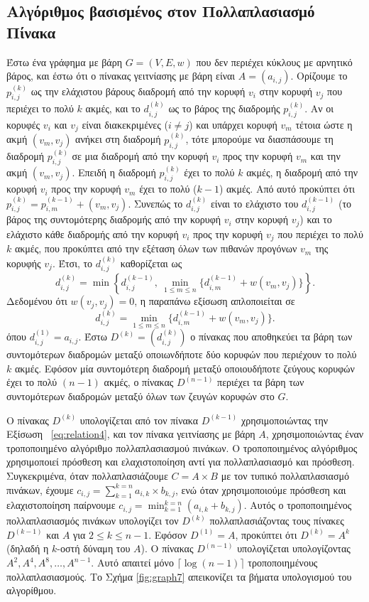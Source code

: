 \documentclass[12pt,a4paper]{article} %
\begin{document}
{\subsection{Αλγόριθμος βασισμένος στον Πολλαπλασιασμό Πίνακα}

Έστω ένα γράφημα με βάρη $G = (V,E,w)$ που δεν περιέχει κύκλους με αρνητικό βάρος, και έστω ότι ο πίνακας γειτνίασης με βάρη είναι $A = (a_{i,j})$. Ορίζουμε το $p_{i,j}^{(k)}$ ως την ελάχιστου βάρους διαδρομή από την κορυφή $v_i$ στην κορυφή $v_j$ που περιέχει το πολύ $k$ ακμές, και το $d_{i,j}^{(k)}$ ως το βάρος της διαδρομής $p_{i,j}^{(k)}$. Αν οι κορυφές $v_i$ και $v_j$ είναι διακεκριμένες ($i\neq j$) και υπάρχει κορυφή $v_m$ τέτοια ώστε η ακμή $(v_m,v_j)$ ανήκει στη διαδρομή $p_{i,j}^{(k)}$, τότε μπορούμε να διασπάσουμε τη διαδρομή $p_{i,j}^{(k)}$ σε μια διαδρομή από την κορυφή $v_i$ προς την κορυφή $v_m$ και την ακμή $(v_m,v_j)$. Επειδή η διαδρομή $p_{i,j}^{(k)}$ έχει το πολύ $k$ ακμές, η διαδρομή από την κορυφή $v_i$ προς την κορυφή $v_m$ έχει το πολύ ($k-1$) ακμές. Από αυτό προκύπτει ότι $p_{i,j}^{(k)} = p_{i,m}^{(k-1)} + (v_m,v_j)$. Συνεπώς το $d_{i,j}^{(k)}$ είναι το ελάχιστο του $d_{i,j}^{(k-1)}$ (το βάρος της συντομότερης διαδρομής από την κορυφή $v_i$ στην κορυφή $v_j$) και το ελάχιστο κάθε διαδρομής από την κορυφή $v_i$ προς την κορυφή $v_j$ που περιέχει το πολύ $k$ ακμές, που προκύπτει από την εξέταση όλων των πιθανών προγόνων $v_m$ της κορυφής $v_j$. Έτσι, το $d_{i,j}^{(k)}$ καθορίζεται ως
\[
d_{i,j}^{(k)} = \min\left\{ d_{i,j}^{(k-1)},\ \min_{1\le m\le n} \{ d_{i,m}^{(k-1)} + w(v_m,v_j)\} \right\}.
\]
Δεδομένου ότι $w(v_j,v_j)=0$, η παραπάνω εξίσωση απλοποιείται σε
\begin{equation}
d_{i,j}^{(k)} = \min_{1\le m\le n} \{ d_{i,m}^{(k-1)} + w(v_m,v_j)\}.
\label{eq:relation4}
\end{equation}
όπου $d_{i,j}^{(1)}=a_{i,j}$. Έστω $D^{(k)}=(d_{i,j}^{(k)})$ ο πίνακας που αποθηκεύει τα βάρη των συντομότερων διαδρομών μεταξύ οποιωνδήποτε δύο κορυφών που περιέχουν το πολύ $k$ ακμές. Εφόσον μία συντομότερη διαδρομή μεταξύ οποιουδήποτε ζεύγους κορυφών έχει το πολύ $(n-1)$ ακμές, ο πίνακας $D^{(n-1)}$ περιέχει τα βάρη των συντομότερων διαδρομών μεταξύ όλων των ζευγών κορυφών στο $G$.

Ο πίνακας $D^{(k)}$ υπολογίζεται από τον πίνακα $D^{(k-1)}$ χρησιμοποιώντας την Εξίσωση ~\ref{eq:relation4}, και τον πίνακα γειτνίασης με βάρη $A$, χρησιμοποιώντας έναν τροποποιημένο αλγόριθμο πολλαπλασιασμού πινάκων. Ο τροποποιημένος αλγόριθμος χρησιμοποιεί πρόσθεση και ελαχιστοποίηση αντί για πολλαπλασιασμό και πρόσθεση. Συγκεκριμένα, όταν πολλαπλασιάζουμε $C = A \times B$ με τον τυπικό πολλαπλασιασμό πινάκων, έχουμε $c_{i,j} = \sum_{k=1}^{k=n} a_{i,k}\times b_{k,j}$, ενώ όταν χρησιμοποιούμε πρόσθεση και ελαχιστοποίηση παίρνουμε $c_{i,j}=\min_{k=1}^{k=n} (a_{i,k} + b_{k,j})$.
Αυτός ο τροποποιημένος πολλαπλασιασμός πινάκων υπολογίζει τον $D^{(k)}$ πολλαπλασιάζοντας τους πίνακες $D^{(k-1)}$ και $A$ για $2\le k\le n-1$. Εφόσον $D^{(1)}=A$, προκύπτει ότι $D^{(k)}=A^k$ (δηλαδή η $k$-οστή δύναμη του $A$). Ο πίνακας $D^{(n-1)}$ υπολογίζεται υπολογίζοντας $A^2, A^4, A^8, \dots, A^{n-1}$. Αυτό απαιτεί μόνο $\lceil\log(n-1)\rceil$ τροποποιημένους πολλαπλασιασμούς. Το Σχήμα \ref{fig:graph7} απεικονίζει τα βήματα υπολογισμού του αλγορίθμου.

}
\end{document}
